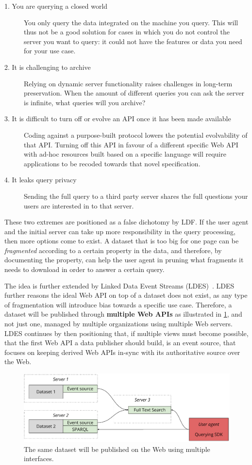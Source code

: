 \documentclass[
]{ceurart}
\begin{document}
\begin{description}
  \item[1. You are querying a closed world] You only query the data integrated on the machine you query. This will thus not be a good solution for cases in which you do not control the server you want to query: it could not have the features or data you need for your use case.
  \item[2. It is challenging to archive]
 Relying on dynamic server functionality raises challenges in long-term preservation.
 When the amount of different queries you can ask the server is infinite, what queries will you archive?
 \item[3. It is difficult to turn off or evolve an API once it has been made available]
 Coding against a purpose-built protocol lowers the potential evolvability of that API.
 Turning off this API in favour of a different specific Web API with ad-hoc resources built based on a specific language will require applications to be recoded towards that novel specification.
 \item[4. It leaks query privacy]
Sending the full query to a third party server shares the full questions your users are interested in to that server.
\end{description}

These two extremes are positioned as a false dichotomy by LDF.
If the user agent and the initial server can take up more responsibility in the query processing, then more options come to exist.
A dataset that is too big for one page can be \textit{fragmented} according to a certain property in the data, and therefore, by documenting the property, can help the user agent in pruning what fragments it needs to download in order to answer a certain query. 

The idea is further extended by Linked Data Event Streams (LDES)~\cite{ldes}.
LDES further reasons the ideal Web API on top of a dataset does not exist, as any type of fragmentation will introduce bias towards a specific use case.
Therefore, a dataset will be published through \textbf{multiple Web APIs} as illustrated in \cref{multiple-views}, and not just one, managed by multiple organizations using multiple Web servers.
LDES continues by then positioning that, if multiple views must become possible, that the first Web API a data publisher should build, is an event source, that focuses on keeping derived Web APIs in-sync with its authoritative source over the Web.

\begin{figure}
  \centering
  \includegraphics[width=\linewidth]{multiple-views}
  \caption{The same dataset will be published on the Web using multiple interfaces.}
  \label{multiple-views}
\end{figure}
\end{document}
